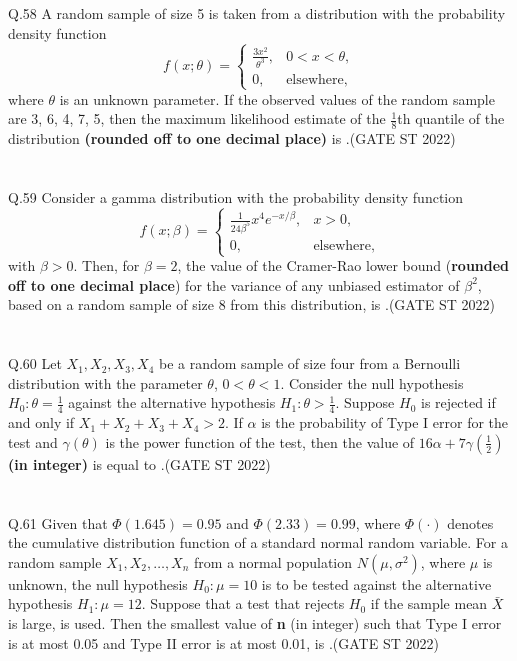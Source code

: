 \documentclass[journal,12pt,onecolumn]{IEEEtran}
\theoremstyle{remark}
\begin{document}
\\
\\
Q.58 A random sample of size 5 is taken from a distribution with the probability density function
\[
f(x; \theta) =
\begin{cases}
	\frac{3x^2}{\theta^3}, & 0 < x < \theta, \\
	0, & \text{elsewhere},
\end{cases}
\]
where $\theta$ is an unknown parameter. If the observed values of the random sample are 3, 6, 4, 7, 5, then the maximum likelihood estimate of the $\frac{1}{8}$th quantile of the distribution \textbf{(rounded off to one decimal place)} is \underline{\hspace{2cm}}.\hfill (GATE ST 2022)\\
\\
\\
Q.59 Consider a gamma distribution with the probability density function 
\[
f(x; \beta) = \begin{cases}
	\frac{1}{24\beta^5}x^4 e^{-x/\beta}, & x > 0,\\
	0, & \text{elsewhere},
\end{cases}
\]
with $\beta > 0$. Then, for $\beta = 2$, the value of the Cramer-Rao lower bound (\textbf{rounded off to one decimal place}) for the variance of any unbiased estimator of $\beta^2$, based on a random sample of size 8 from this distribution, is \underline{\hspace{2cm}}.\hfill (GATE ST 2022)\\
\\
\\
Q.60 Let $X_1, X_2, X_3, X_4$ be a random sample of size four from a Bernoulli distribution with the parameter $\theta$, $0 < \theta < 1$. Consider the null hypothesis $H_0: \theta = \frac{1}{4}$ against the alternative hypothesis $H_1: \theta > \frac{1}{4}$. Suppose $H_0$ is rejected if and only if $X_1 + X_2 + X_3 + X_4 > 2$. If $\alpha$ is the probability of Type I error for the test and $\gamma(\theta)$ is the power function of the test, then the value of $16\alpha + 7 \gamma \left(\frac{1}{2}\right)$ \textbf{(in integer)} is equal to \underline{\hspace{5cm}}.\hfill (GATE ST 2022)\\
\\
\\
Q.61 Given that $\Phi(1.645) = 0.95$ and $\Phi(2.33) = 0.99$, where $\Phi(\cdot)$ denotes the cumulative distribution function of a standard normal random variable. For a random sample $X_1, X_2, \dots, X_n$ from a normal population $N(\mu, \sigma^2)$, where $\mu$ is unknown, the null hypothesis $H_0: \mu = 10$ is to be tested against the alternative hypothesis $H_1: \mu = 12$. Suppose that a test that rejects $H_0$ if the sample mean $\bar{X}$ is large, is used. Then the smallest value of \textbf{n} (in integer) such that Type I error is at most 0.05 and Type II error is at most 0.01, is \underline{\hspace{2cm}}.\hfill (GATE ST 2022)\\
\end{document}
